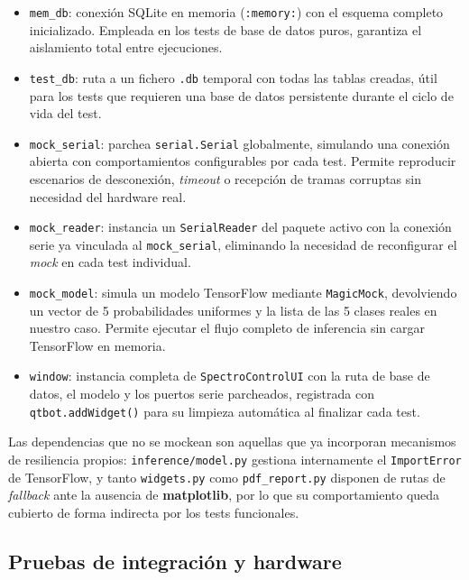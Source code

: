 \begin{itemize}
    \item \texttt{mem\_db}: conexión SQLite en memoria (\texttt{:memory:})
    con el esquema completo inicializado. Empleada en los tests de base
    de datos puros, garantiza el aislamiento total entre ejecuciones.
    \item \texttt{test\_db}: ruta a un fichero \texttt{.db} temporal con
    todas las tablas creadas, útil para los tests que requieren una base
    de datos persistente durante el ciclo de vida del test.
    \item \texttt{mock\_serial}: parchea \texttt{serial.Serial}
    globalmente, simulando una conexión abierta con comportamientos
    configurables por cada test. Permite reproducir escenarios de
    desconexión, \textit{timeout} o recepción de tramas corruptas sin
    necesidad del hardware real.
    \item \texttt{mock\_reader}: instancia un \texttt{SerialReader} del
    paquete activo con la conexión serie ya vinculada al
    \texttt{mock\_serial}, eliminando la necesidad de reconfigurar
    el \textit{mock} en cada test individual.
    \item \texttt{mock\_model}: simula un modelo TensorFlow mediante
    \texttt{MagicMock}, devolviendo un vector de 5 probabilidades
    uniformes y la lista de las 5 clases reales en nuestro caso. Permite ejecutar el flujo
    completo de inferencia sin cargar TensorFlow en memoria.
    \item \texttt{window}: instancia completa de \texttt{SpectroControlUI}
    con la ruta de base de datos, el modelo y los puertos serie
    parcheados, registrada con \texttt{qtbot.addWidget()} para su
    limpieza automática al finalizar cada test.
\end{itemize}

Las dependencias que no se mockean son aquellas que ya incorporan
mecanismos de resiliencia propios: \texttt{inference/model.py} gestiona
internamente el \texttt{ImportError} de TensorFlow, y tanto
\texttt{widgets.py} como \texttt{pdf\_report.py} disponen de rutas de
\textit{fallback} ante la ausencia de \textbf{matplotlib}, por lo que
su comportamiento queda cubierto de forma indirecta por los tests
funcionales.

\subsection*{Pruebas de integración y hardware}

